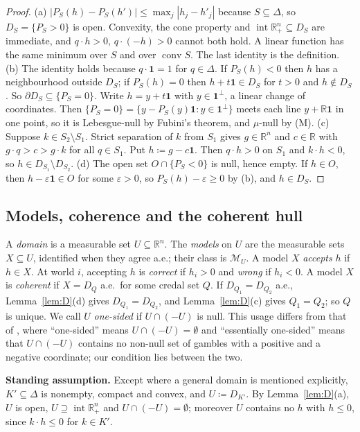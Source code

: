 \documentclass[11pt]{article}
\newcommand{\R}{\mathbb{R}}
\newcommand{\one}{\mathbf{1}}
\newcommand{\M}{\mathcal{M}}
\newcommand{\Rpp}{\inter\R^n_{+}}
\DeclareMathOperator{\conv}{conv}
\DeclareMathOperator{\inter}{int}
\theoremstyle{plain}
\theoremstyle{definition}
\theoremstyle{remark}
\begin{document}
\begin{proof}
(a) $|P_S(h)-P_S(h')|\le\max_j|h_j-h'_j|$ because $S\subseteq\Delta$, so $D_S=\{P_S>0\}$
is open. Convexity, the cone property and $\Rpp\subseteq D_S$ are immediate, and $q\cdot
h>0$, $q\cdot(-h)>0$ cannot both hold. A linear function has the same minimum over $S$
and over $\conv S$. The last identity is the definition.
(b) The identity holds because $q\cdot\one=1$ for $q\in\Delta$. If $P_S(h)<0$ then $h$
has a neighbourhood outside $D_S$; if $P_S(h)=0$ then $h+t\one\in D_S$ for $t>0$ and
$h\notin D_S$. So $\partial D_S\subseteq\{P_S=0\}$. Write $h=y+t\one$ with $y\in
\one^\perp$, a linear change of coordinates. Then $\{P_S=0\}=\{y-P_S(y)\one:y\in
\one^\perp\}$ meets each line $y+\R\one$ in one point, so it is Lebesgue-null by Fubini's
theorem, and $\mu$-null by (M).
(c) Suppose $k\in S_2\setminus S_1$. Strict separation of $k$ from $S_1$ gives $g\in\R^n$
and $c\in\R$ with $g\cdot q>c>g\cdot k$ for all $q\in S_1$. Put $h\coloneqq g-c\one$. Then
$q\cdot h>0$ on $S_1$ and $k\cdot h<0$, so $h\in D_{S_1}\setminus D_{S_2}$.
(d) The open set $O\cap\{P_S<0\}$ is null, hence empty. If $h\in O$, then $h-\varepsilon
\one\in O$ for some $\varepsilon>0$, so $P_S(h)-\varepsilon\ge0$ by (b), and $h\in D_S$.
\end{proof}

\subsection{Models, coherence and the coherent hull}

A \emph{domain} is a measurable set $U\subseteq\R^n$. The \emph{models} on $U$ are the
measurable sets $X\subseteq U$, identified when they agree a.e.; their class is $\M_U$.
A model $X$ \emph{accepts} $h$ if $h\in X$. At world $i$, accepting $h$ is \emph{correct}
if $h_i>0$ and \emph{wrong} if $h_i<0$. A model $X$ is \emph{coherent} if $X=D_Q$ a.e.\
for some credal set $Q$. If $D_{Q_1}=D_{Q_2}$ a.e., Lemma~\ref{lem:D}(d) gives $D_{Q_1}=
D_{Q_2}$, and Lemma~\ref{lem:D}(c) gives $Q_1=Q_2$; so $Q$ is unique. We call $U$
\emph{one-sided} if $U\cap(-U)$ is null. This usage differs from that of \cite{KCM},
where ``one-sided'' means $U\cap(-U)=\emptyset$ and ``essentially one-sided'' means that
$U\cap(-U)$ contains no non-null set of gambles with a positive and a negative coordinate;
our condition lies between the two.

\smallskip\noindent\textbf{Standing assumption.} Except where a general domain is
mentioned explicitly, $K'\subseteq\Delta$ is nonempty, compact and convex, and
$U\coloneqq D_{K'}$. By Lemma~\ref{lem:D}(a), $U$ is open, $U\supseteq\Rpp$ and $U\cap
(-U)=\emptyset$; moreover $U$ contains no $h$ with $h\le0$, since $k\cdot h\le0$ for
$k\in K'$.
\end{document}
